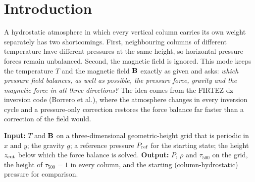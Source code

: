 


\begin{abstract}
\noindent Starting from an atmosphere whose columns are each in hydrostatic equilibrium, this mode adjusts the gas pressure
in three dimensions so that pressure, gravity and the Lorentz force of a given magnetic field balance each other as well as
possible. Temperature and magnetic field stay fixed; only the pressure changes. Because a fixed field generally cannot hold
up every horizontal density contrast, an exact equilibrium does not exist, and the pressure is found as the minimiser of a
weighted sum of squared relative force residuals. We derive the force balance, show why its pressure part is a Poisson
problem, explain what a pressure change can and cannot achieve, define the residuals and their weights, and describe the
Gauss--Newton iteration, the Fourier-mode preconditioner, the step control, the stopping rule, the treatment of the
low-$\beta$ upper atmosphere and the computation of the optical depth. All assumptions, including how the pressure level is
fixed, are listed.
\end{abstract}

\section{Introduction}
A hydrostatic atmosphere in which every vertical column carries its own weight separately has two shortcomings. First,
neighbouring columns of different temperature have different pressures at the same height, so horizontal pressure forces
remain unbalanced. Second, the magnetic field is ignored. This mode keeps the temperature $T$ and the magnetic field $\mathbf B$
exactly as given and asks: \emph{which pressure field balances, as well as possible, the pressure force, gravity and the
magnetic force in all three directions?} The idea comes from the FIRTEZ-dz inversion code (Borrero et al.), where the
atmosphere changes in every inversion cycle and a pressure-only correction restores the force balance far faster than a
correction of the field would.

\textbf{Input:} $T$ and $\mathbf B$ on a three-dimensional geometric-height grid that is periodic in $x$ and $y$; the gravity $g$;
a reference pressure $P_{\rm ref}$ for the starting state; the height $z_{\rm cut}$ below which the force balance is solved.
\textbf{Output:} $P$, $\rho$ and $\tau_{500}$ on the grid, the height of $\tau_{500}=1$ in every column, and the starting
(column-hydrostatic) pressure for comparison.

